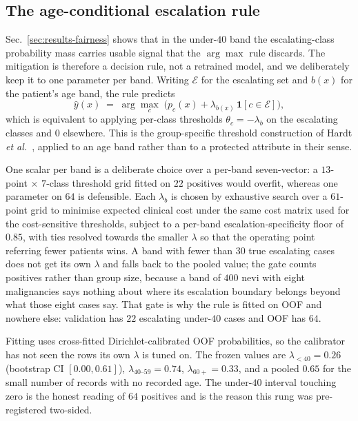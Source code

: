 \documentclass[journal]{IEEEtran}
\begin{document}
\subsection{The age-conditional escalation rule}
\label{sec:agerule}
Sec.~\ref{sec:results-fairness} shows that in the under-$40$ band the escalating-class
probability mass carries usable signal that the $\arg\max$ rule discards. The mitigation is
therefore a decision rule, not a retrained model, and we deliberately keep it to one
parameter per band. Writing $\mathcal{E}$ for the escalating set and $b(x)$ for the patient's
age band, the rule predicts
\begin{equation}
\hat{y}(x) \;=\; \arg\max_{c}\;\bigl(p_c(x) + \lambda_{b(x)}\,\mathbf{1}[c \in \mathcal{E}]\bigr),
\label{eq:lambda}
\end{equation}
which is equivalent to applying per-class thresholds $\theta_c = -\lambda_b$ on the escalating
classes and $0$ elsewhere. This is the group-specific threshold construction of Hardt
\emph{et al.}~\cite{hardt2016equality}, applied to an age band rather than to a protected
attribute in their sense.

One scalar per band is a deliberate choice over a per-band seven-vector: a $13$-point
$\times$ $7$-class threshold grid fitted on $22$ positives would overfit, whereas one
parameter on $64$ is defensible. Each $\lambda_b$ is chosen by exhaustive search over a
$61$-point grid to minimise expected clinical cost under the same cost matrix used for the
cost-sensitive thresholds, subject to a per-band escalation-specificity floor of $0.85$, with
ties resolved towards the smaller $\lambda$ so that the operating point referring fewer
patients wins. A band with fewer than $30$ true escalating cases does not get its own
$\lambda$ and falls back to the pooled value; the gate counts positives rather than group
size, because a band of $400$ nevi with eight malignancies says nothing about where its
escalation boundary belongs beyond what those eight cases say. That gate is why the rule is
fitted on OOF and nowhere else: validation has $22$ escalating under-$40$ cases and OOF has
$64$.

Fitting uses cross-fitted Dirichlet-calibrated OOF probabilities, so the calibrator has not
seen the rows its own $\lambda$ is tuned on. The frozen values are $\lambda_{<40}=0.26$
(bootstrap CI $[0.00, 0.61]$), $\lambda_{40\text{--}59}=0.74$, $\lambda_{60+}=0.33$, and a
pooled $0.65$ for the small number of records with no recorded age. The under-$40$ interval
touching zero is the honest reading of $64$ positives and is the reason this rung was
pre-registered two-sided.
\end{document}
